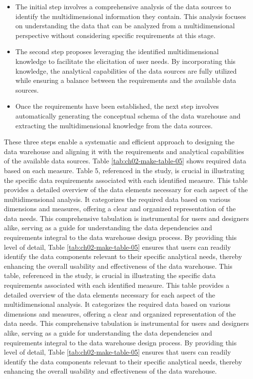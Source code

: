 \documentclass[
11pt, %
oneside, %
english, %
singlespacing, %
]{macthesis} %
\begin{document}
\begin{itemize}
\item
  The initial step involves a comprehensive analysis of the data sources to identify the multidimensional information they contain. This analysis focuses on understanding the data that can be analyzed from a multidimensional perspective without considering specific requirements at this stage.
\item
  The second step proposes leveraging the identified multidimensional knowledge to facilitate the elicitation of user needs. By incorporating this knowledge, the analytical capabilities of the data sources are fully utilized while ensuring a balance between the requirements and the available data sources.
\item
  Once the requirements have been established, the next step involves automatically generating the conceptual schema of the data warehouse and extracting the multidimensional knowledge from the data sources.
\end{itemize}

These three steps enable a systematic and efficient approach to designing the data warehouse and aligning it with the requirements and analytical capabilities of the available data sources. Table \ref{tab:ch02-make-table-05} shows required data based on each measure. Table 5, referenced in the study, is crucial in illustrating the specific data requirements associated with each identified measure. This table provides a detailed overview of the data elements necessary for each aspect of the multidimensional analysis. It categorizes the required data based on various dimensions and measures, offering a clear and organized representation of the data needs. This comprehensive tabulation is instrumental for users and designers alike, serving as a guide for understanding the data dependencies and requirements integral to the data warehouse design process. By providing this level of detail, Table \ref{tab:ch02-make-table-05} ensures that users can readily identify the data components relevant to their specific analytical needs, thereby enhancing the overall usability and effectiveness of the data warehouse. This table, referenced in the study, is crucial in illustrating the specific data requirements associated with each identified measure. This table provides a detailed overview of the data elements necessary for each aspect of the multidimensional analysis. It categorizes the required data based on various dimensions and measures, offering a clear and organized representation of the data needs. This comprehensive tabulation is instrumental for users and designers alike, serving as a guide for understanding the data dependencies and requirements integral to the data warehouse design process. By providing this level of detail, Table \ref{tab:ch02-make-table-05} ensures that users can readily identify the data components relevant to their specific analytical needs, thereby enhancing the overall usability and effectiveness of the data warehouse.
\end{document}
